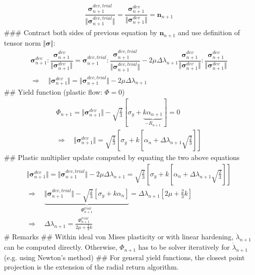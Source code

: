 \documentclass[]{scrartcl}
\begin{document}
\begin{easylist}
\begin{gather*}
\dfrac{\boldsymbol{\sigma}^{dev, trial}_{n+1}}{\Vert \boldsymbol{\sigma}^{dev, trial}_{n+1} \Vert}
  = \dfrac{\boldsymbol{\sigma}^{dev}_{n+1}}{\Vert \boldsymbol{\sigma}^{dev}_{n+1} \Vert}
  = \boldsymbol{n}_{n+1}
\end{gather*}
### Contract both sides of previous equation by $\boldsymbol{n}_{n+1}$ and use definition of tensor norm $\Vert \boldsymbol{\sigma} \Vert$:
\begin{gather*}
\boldsymbol{\sigma}^{dev}_{n+1} : \dfrac{\boldsymbol{\sigma}^{dev}_{n+1}}{\Vert \boldsymbol{\sigma}^{dev}_{n+1} \Vert}
  = \boldsymbol{\sigma}^{dev, trial}_{n+1} : \dfrac{\boldsymbol{\sigma}^{dev, trial}_{n+1}}{\Vert \boldsymbol{\sigma}^{dev, trial}_{n+1} \Vert}
  - 2 \mu \Delta \lambda_{n+1} \dfrac{\boldsymbol{\sigma}^{dev}_{n+1}}{\Vert \boldsymbol{\sigma}^{dev}_{n+1} \Vert} : \dfrac{\boldsymbol{\sigma}^{dev}_{n+1}}{\Vert \boldsymbol{\sigma}^{dev}_{n+1} \Vert} \\
\Rightarrow \quad
\Vert \boldsymbol{\sigma}^{dev}_{n+1} \Vert
  = \Vert \boldsymbol{\sigma}^{dev, trial}_{n+1} \Vert
  - 2 \mu \Delta \lambda_{n+1}
\end{gather*}
## Yield function (plastic flow: $\Phi = 0$)
\begin{gather*}
\Phi_{n+1}
  = \Vert \boldsymbol{\sigma}^{dev}_{n+1} \Vert - \sqrt{\frac{2}{3}} \left[ \sigma_{y} + \underbrace{k \alpha_{n+1}}_{- R_{n+1}} \right]
  = 0 \\
\Rightarrow \quad
\Vert \boldsymbol{\sigma}^{dev}_{n+1} \Vert
  = \sqrt{\frac{2}{3}} \left[ \sigma_{y} + k \left[ \alpha_{n} + \Delta \lambda_{n+1} \sqrt{\frac{2}{3}} \right] \right]
\end{gather*}
## Plastic multiplier update computed by equating the two above equations
\begin{gather*}
\Vert \boldsymbol{\sigma}^{dev}_{n+1} \Vert
  = \Vert \boldsymbol{\sigma}^{dev, trial}_{n+1} \Vert
  - 2 \mu \Delta \lambda_{n+1}
  = \sqrt{\frac{2}{3}} \left[ \sigma_{y} + k \left[ \alpha_{n} + \Delta \lambda_{n+1} \sqrt{\frac{2}{3}} \right] \right] \\
\Rightarrow \quad
\underbrace{\Vert \boldsymbol{\sigma}^{dev, trial}_{n+1} \Vert - \sqrt{\frac{2}{3}} \left[ \sigma_{y} + k \alpha_{n} \right]}_{\Phi^{trial}_{n+1}}
  = \Delta \lambda_{n+1} \left[ 2 \mu + \frac{2}{3} k \right] \\
\Rightarrow \quad
\Delta \lambda_{n+1}
  = \frac{\Phi^{trial}_{n+1}}{2 \mu + \frac{2}{3} k}
\end{gather*}
# Remarks
## Within ideal von Mises plasticity or with linear hardening, $\dot{\lambda}_{n+1}$ can be computed directly.
   Otherwise, $\Phi_{n+1}$ has to be solver iteratively for $\dot{\lambda}_{n+1}$ (e.g. using Newton's method)
## For general yield functions, the closest point projection is the extension of the radial return algorithm.
\end{easylist}
\end{document}
